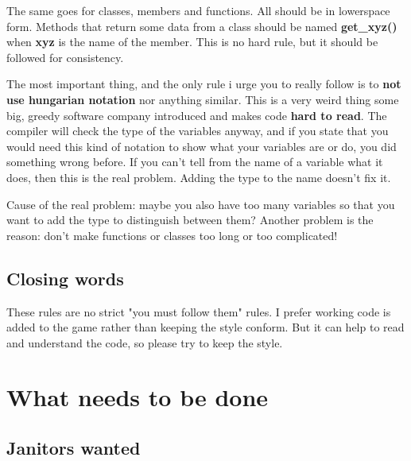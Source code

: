 \documentclass{report}
\begin{document}
    The same goes for classes, members and functions. All should be in
    lowerspace form. Methods that return some data from a class should
    be named \textbf{get\_xyz()} when \textbf{xyz} is the name of the
    member. This is no hard rule, but it should be followed for
    consistency.
    
    The most important thing, and the only rule i urge you to really
    follow is to \textbf{not use hungarian notation} nor anything
    similar. This is a very weird thing some big, greedy software
    company introduced and makes code \textbf{hard to read}. The
    compiler will check the type of the variables anyway, and if you
    state that you would need this kind of notation to show what your
    variables are or do, you did something wrong before. If you can't
    tell from the name of a variable what it does, then this is the real
    problem. Adding the type to the name doesn't fix it.

    Cause of the real problem: maybe you also have too many variables so
    that you want to add the type to distinguish between them? Another
    problem is the reason: don't make functions or classes too long or
    too complicated!
    

    \subsection{Closing words}

      These rules are no strict "you must follow them" rules. I prefer
      working code is added to the game rather than keeping the style
      conform. But it can help to read and understand the code, so
      please try to keep the style.
    
    \section{What needs to be done}

    \subsection{Janitors wanted}


 
\end{document}
